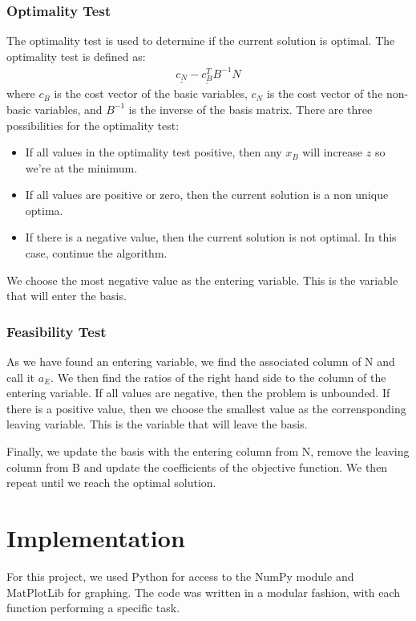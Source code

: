 \documentclass{article}
\numberwithin{equation}{section}
\begin{document}
\subsubsection{Optimality Test}
The optimality test is used to determine if the current solution is optimal. The optimality test is defined as:
\begin{align}
    \underline{c_N} - \underline{c_B^T} B^{-1} N 
\end{align}
where $c_B$ is the cost vector of the basic variables, $c_N$ is the cost vector of the non-basic variables, and $B^{-1}$ is the inverse of the basis matrix.
There are three possibilities for the optimality test:
\begin{itemize}
    \item If all values in the optimality test positive, then any $x_B$ will increase $z$ so we're at the minimum.
    \item If all values are positive or zero, then the current solution is a non unique optima.
    \item If there is a negative value, then the current solution is not optimal. In this case, continue the algorithm.
\end{itemize}
We choose the most negative value as the entering variable. This is the variable that will enter the basis.
\subsubsection{Feasibility Test}
As we have found an entering variable, we find the associated column of N and call it $a_E$. We then find the ratios of the right hand side to the column of the entering variable. If all values are negative, then the problem is unbounded. If there is a positive value, then we choose the smallest value as the corrensponding leaving variable. This is the variable that will leave the basis.

Finally, we update the basis with the entering column from N, remove the leaving column from B and update the coefficients of the objective function. We then repeat until we reach the optimal solution.

\newpage
\section{Implementation}
For this project, we used Python for access to the NumPy module and MatPlotLib for graphing. The code was written in a modular fashion, with each function performing a specific task.
\end{document}
